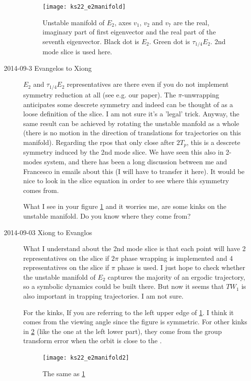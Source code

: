 \begin{description}
\begin{figure}[h]
  \centering
  \texttt{[image: ks22\_e2manifold]}
  \caption{Unstable manifold of $E_2$, axes $v_1$, $v_2$ and $v_7$ are the
    real, imaginary part of first eigenvector and the real part of the
    seventh eigenvector. Black dot is $E_2$. Green dot is $\tau_{1/4}E_2$.
    2nd mode slice is used here.
  }
  \label{fig:ks22_e2manifold}
\end{figure}

\item[2014-09-3 Evangelos to Xiong]
$E_2$ and $\tau_{1/4}E_2$ representatives are there even if you do not implement symmetry
reduction at all (see e.g. our paper). The $\pi$-unwrapping anticipates some descrete symmetry
and indeed can be thought of as a loose definition of the slice. I am not sure it's a 'legal' trick.
Anyway, the same result can be achieved by rotating the unstable manfold as a whole (there is no
motion in the direction of translations for trajectories on this manifold). Regarding the rpos that only
close after $2T_p$, this is a descrete symmetry induced by the 2nd mode slice. We have seen this
also in 2-modes system, and there has been a long discussion between me and Francesco in emails about this
(I will have to transfer it here). It would be nice to look in the slice equation in order to see where this
symmetry comes from.

What I see in your figure \ref{fig:ks22_e2manifold} and it worries me, are some kinks on the unstable manifold.
Do you know where they come from?

\item[2014-09-03 Xiong to Evanglos]
What I understand about the 2nd mode slice is
that each point will have 2 representatives on the slice if $2\pi$ phase
wrapping is implemented and 4 representatives on the slice if $\pi$ phase
is used. I just hope to check whether the unstable manifold of $E_2$
captures the majority of an ergodic trajectory, so a symbolic dynamics
could be built there. But now it seems that $TW_1$ is also important
in trapping trajectories. I am not sure.

For the kinks, If you are referring to the left upper
edge of \ref{fig:ks22_e2manifold}. I think it comes from the viewing
angle since the figure is symmetric. For other kinks in
\ref{fig:ks22_e2manifold2} (like the one at the left lower part), they
come from the group transform error when the orbit is close to the
{\sliceBord}.

\begin{figure}[h]
  \centering
  \texttt{[image: ks22\_e2manifold2]}
  \caption{ The same as \ref{fig:ks22_e2manifold}
  }
  \label{fig:ks22_e2manifold2}
\end{figure}


\end{description}
